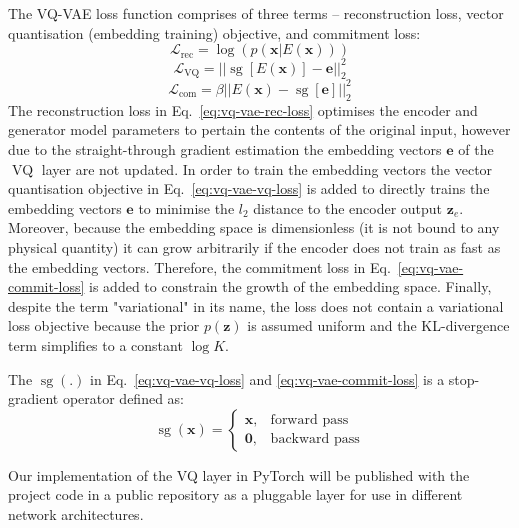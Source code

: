 \documentclass{article}
\DeclareMathOperator{\sg}{sg}
\DeclareMathOperator{\VQ}{VQ}
\begin{document}
The VQ-VAE loss function comprises of three terms -- reconstruction loss, vector quantisation (embedding training) objective, and commitment loss:
\begin{equation}
    \label{eq:vq-vae-rec-loss}
    \mathcal{L}_{\text{rec}} = \log(p(\mathbf{x}|E(\mathbf{x})))
\end{equation}
\begin{equation}
    \label{eq:vq-vae-vq-loss}
    \mathcal{L}_{\VQ} = ||\sg[E(\mathbf{x})] - \mathbf{e}||_2^2
\end{equation}
\begin{equation}
    \label{eq:vq-vae-commit-loss}
    \mathcal{L}_{\text{com}} = \beta||E(\mathbf{x}) - \sg[\mathbf{e}]||^2_2
\end{equation}
The reconstruction loss in Eq.~\ref{eq:vq-vae-rec-loss} optimises the encoder and generator model parameters to pertain the contents of the original input, however due to the straight-through gradient estimation the embedding vectors $\mathbf{e}$ of the $\VQ$ layer are not updated. 
In order to train the embedding vectors the vector quantisation objective in Eq.~\ref{eq:vq-vae-vq-loss} is added to directly trains the embedding vectors $\mathbf{e}$ to minimise the $l_2$ distance to the encoder output $\mathbf{z}_e$. 
Moreover, because the embedding space is dimensionless (it is not bound to any physical quantity) it can grow arbitrarily if the encoder does not train as fast as the embedding vectors. Therefore, the commitment loss in Eq.~\ref{eq:vq-vae-commit-loss} is added to constrain the growth of the embedding space. 
Finally, despite the term "variational" in its name, the loss does not contain a variational loss objective because the prior $p(\mathbf{z})$ is assumed uniform and the KL-divergence term simplifies to a constant $\log K$.

The $\sg(.)$ in Eq.~\ref{eq:vq-vae-vq-loss} and \ref{eq:vq-vae-commit-loss} is a stop-gradient operator defined as:
\begin{equation}
    \sg(\mathbf{x}) = 
    \begin{cases}
    \mathbf{x},  & \text{forward pass}\\
    \mathbf{0},  & \text{backward pass}
    \end{cases}
\end{equation}

Our implementation of the VQ layer in PyTorch will be published with the project code in a public repository as a pluggable layer for use in different network architectures.
\end{document}
